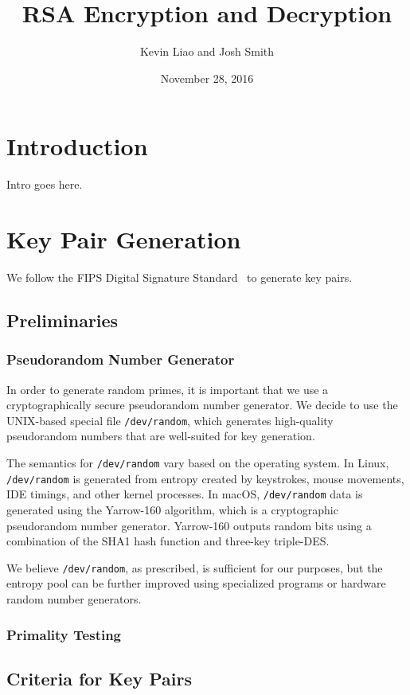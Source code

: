 \documentclass[a4paper]{article}
\title{RSA Encryption and Decryption}
\author{Kevin Liao and Josh Smith}
\date{November 28, 2016}
\begin{document}
\maketitle

\section{Introduction}
Intro goes here.
\section{Key Pair Generation}

We follow the FIPS Digital Signature Standard~\cite{fips2013186} to generate key pairs.

\subsection{Preliminaries}

\subsubsection{Pseudorandom Number Generator}
In order to generate random primes, it is important that we use a cryptographically secure pseudorandom number generator. We decide to use the UNIX-based special file {\tt /dev/random}, which generates high-quality pseudorandom numbers that are well-suited for key generation.

The semantics for {\tt /dev/random} vary based on the operating system. In Linux,  {\tt /dev/random} is generated from entropy created by keystrokes, mouse movements, IDE timings, and other kernel processes. In macOS, {\tt /dev/random} data is generated using the Yarrow-160 algorithm, which is a cryptographic pseudorandom number generator. Yarrow-160 outputs random bits using a combination of the SHA1 hash function and three-key triple-DES.

We believe {\tt /dev/random}, as prescribed, is sufficient for our purposes, but the entropy pool can be further improved using specialized programs or hardware random number generators.

\subsubsection{Primality Testing}
\subsection{Criteria for Key Pairs}
\end{document}
